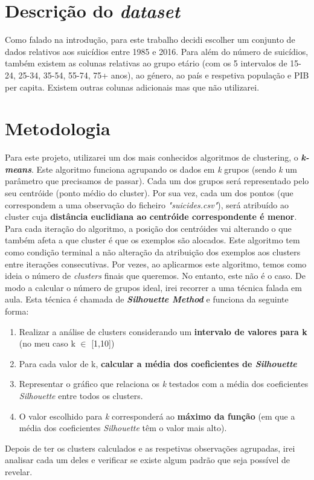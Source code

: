 \documentclass[a4paper,12pt]{article}
\begin{document}
\section{Descrição do \textit{dataset}}
Como falado na introdução, para este trabalho decidi escolher um conjunto de dados relativos aos suicídios entre 1985 e 2016. Para além do número
de suicídios, também existem as colunas relativas ao grupo etário (com os 5 intervalos de 15-24, 25-34, 35-54, 55-74, 75+ anos), ao género, ao país e respetiva população e PIB per capita. Existem outras colunas
adicionais mas que não utilizarei.  

\section{Metodologia}
Para este projeto, utilizarei um dos mais conhecidos algoritmos de clustering, o \textbf{\textit{k-means}}. Este algoritmo funciona agrupando os dados em \textit{k} grupos (sendo \textit{k} um parâmetro que precisamos de passar). Cada um dos grupos será representado pelo seu centróide (ponto médio do cluster). Por sua vez, cada um dos pontos (que correspondem a uma observação do ficheiro \textit{"suicides.csv"}), será atribuído ao cluster cuja \textbf{distância euclidiana ao centróide correspondente é menor}. Para cada iteração do algoritmo, a posição dos centróides vai alterando o que também afeta a que cluster é que os exemplos são alocados. Este algoritmo tem como condição terminal a não alteração da atribuição dos exemplos aos clusters entre iterações consecutivas.
Por vezes, ao aplicarmos este algoritmo, temos como ideia o número de \textit{clusters} finais que queremos. No entanto, este não é o caso. De modo a calcular o número de grupos ideal, irei recorrer a uma técnica falada em aula. Esta técnica é chamada de \textbf{\textit{Silhouette Method}} e funciona da seguinte forma:
\begin{enumerate}
	\item Realizar a análise de clusters considerando um \textbf{intervalo de valores para k} (no meu caso k $\in$ [1,10])
	\item Para cada valor de k, \textbf{calcular a média dos coeficientes de \textit{Silhouette}}
	\item Representar o gráfico que relaciona os \textit{k} testados com a média dos coeficientes \textit{Silhouette} entre todos os clusters.
	\item O valor escolhido para \textit{k} corresponderá ao \textbf{máximo da função} (em que a média dos coeficientes \textit{Silhouette} têm o valor mais alto).
\end{enumerate}
Depois de ter os clusters calculados e as respetivas observações agrupadas, irei analisar cada um deles e verificar se existe algum padrão que seja possível de revelar.
\end{document}
